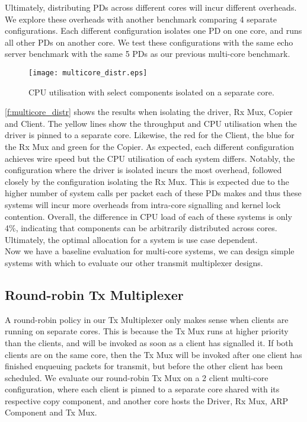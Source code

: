 Ultimately, distributing PDs across different cores will incur different overheads. We explore these overheads with another benchmark
comparing 4 separate configurations. Each different configuration isolates one PD on one core, and runs all other PDs on another core. 
We test these configurations with the same echo server benchmark with the same 5 PDs as our previous multi-core benchmark.

\begin{figure}[H]
    \centering
    \texttt{[image: multicore\_distr.eps]}
    \caption{CPU utilisation with select components isolated on a separate core.}
    \label{f:multicore_distr}
\end{figure}

\autoref{f:multicore_distr} shows the results when isolating the driver, Rx Mux, Copier and Client. The yellow lines show the throughput
and CPU utilisation when the driver is pinned to a separate core. 
Likewise, the red for the Client, the blue for the Rx Mux and green for
the Copier. As expected, each different configuration achieves wire speed but the CPU utilisation of each system differs. Notably, 
the configuration where the driver is isolated incurs the most overhead, followed closely by the configuration isolating the Rx Mux. This is 
expected due to the higher number of system calls per packet each of these PDs makes and thus these systems will incur more overheads from
intra-core signalling and kernel lock contention. Overall, the difference in CPU load of each of these systems is only 4\%, indicating that
components can be arbitrarily distributed across cores. Ultimately, the optimal allocation for a system is use case dependent.\\

Now we have a baseline evaluation for multi-core systems, we can design simple systems with which to evaluate our other transmit multiplexer
designs. 

\subsection{Round-robin Tx Multiplexer}

A round-robin policy in our Tx Multiplexer only makes sense when clients are running on separate cores. This is because the Tx Mux runs at higher
priority than the clients, and will be invoked as soon as a client has signalled it. If both clients are on the same core, then the Tx Mux will
be invoked after one client has finished enqueuing packets for transmit, but before the other client has been scheduled. We evaluate our round-robin
Tx Mux on a 2 client multi-core configuration, where each client is pinned to a separate core shared with its respective copy component, and another
core hosts the Driver, Rx Mux, ARP Component and Tx Mux. 

